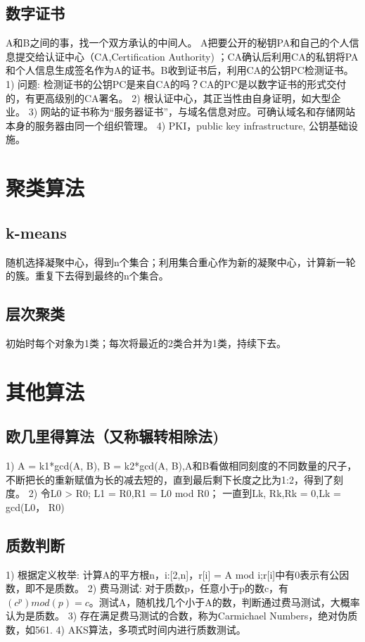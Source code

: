 \documentclass[UTF8]{../computerUniverse}
\begin{document}
\subsection{数字证书}
A和B之间的事，找一个双方承认的中间人。
A把要公开的秘钥PA和自己的个人信息提交给认证中心（CA,Certification Authority) ；CA确认后利用CA的私钥将PA和个人信息生成签名作为A的证书。B收到证书后，利用CA的公钥PC检测证书。
1) 问题: 检测证书的公钥PC是来自CA的吗？CA的PC是以数字证书的形式交付的，有更高级别的CA署名。
2) 根认证中心，其正当性由自身证明，如大型企业。
3) 网站的证书称为“服务器证书”，与域名信息对应。可确认域名和存储网站本身的服务器由同一个组织管理。
4) PKI，public key infrastructure, 公钥基础设施。



\section{聚类算法}

\subsection{k-means}
随机选择凝聚中心，得到n个集合；利用集合重心作为新的凝聚中心，计算新一轮的簇。重复下去得到最终的n个集合。

\subsection{层次聚类}
初始时每个对象为1类；每次将最近的2类合并为1类，持续下去。



\section{其他算法}

\subsection{欧几里得算法（又称辗转相除法) }
1) A = k1*gcd(A, B), B = k2*gcd(A, B),A和B看做相同刻度的不同数量的尺子，不断把长的重新赋值为长的减去短的，直到最后剩下长度之比为1:2，得到了刻度。
2) 令L0 > R0;
L1 = R0,R1 = L0 mod R0；
一直到Lk, Rk,Rk = 0,Lk = gcd(L0， R0)


\subsection{质数判断}
1) 根据定义枚举: 计算A的平方根n，i:[2,n]，r[i] = A mod i;r[i]中有0表示有公因数，即不是质数。
2) 费马测试: 对于质数p，任意小于p的数c，有$(c^p)mod(p) = c$。测试A，随机找几个小于A的数，判断通过费马测试，大概率认为是质数。
3) 存在满足费马测试的合数，称为Carmichael Numbers，绝对伪质数，如561.
4) AKS算法，多项式时间内进行质数测试。
\end{document}
